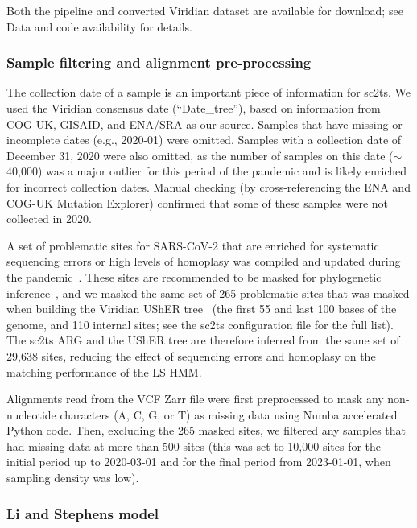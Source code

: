 \documentclass[12pt]{article}
\begin{document}
Both the pipeline and converted Viridian dataset are available for download;
see Data and code availability for details.


\subsubsection*{Sample filtering and alignment pre-processing}

The collection date of a sample
is an important piece of information for sc2ts.
We used the Viridian consensus date (``Date\_tree''),
based on information from COG-UK, GISAID, and ENA/SRA as our source.
Samples that have missing or incomplete dates (e.g., 2020-01) were omitted.
Samples with a collection date of December 31, 2020
were also omitted,
as the number of samples on this date ($\sim$40,000) was a major outlier
for this period of the pandemic and is likely enriched
for incorrect collection dates.
Manual checking (by cross-referencing the ENA and COG-UK Mutation Explorer)
confirmed that some of these samples were not collected in 2020.

A set of problematic sites
for SARS-CoV-2 that are enriched for systematic sequencing errors or
high levels of homoplasy was compiled and updated during
the pandemic~\cite{DeMaio2020issues,Turakhia2020stability}.
These sites are recommended to be masked for phylogenetic
inference~\cite{Turakhia2020stability}, and
we masked the same set of 265 problematic sites that was masked
when building the Viridian UShER tree~\cite{Hunt2026}
(the first 55 and last 100 bases of the genome, and 110 internal sites;
see the sc2ts configuration file for the full list).
The sc2ts ARG and the UShER tree are therefore inferred from the
same set of 29,638 sites,
reducing the effect of sequencing errors and homoplasy
on the matching performance of the LS HMM.

Alignments read from the VCF Zarr file were first preprocessed
to mask any non-nucleotide characters (A, C, G, or T) as missing data
using Numba accelerated \cite{Lam2015numba} Python code.
Then, excluding the 265 masked sites, we filtered any samples that had missing data at more than 500 sites (this was set to 10,000 sites for the initial period up to 2020-03-01
and for the final period from 2023-01-01,
when sampling density was low).

\subsubsection*{Li and Stephens model}
\end{document}
